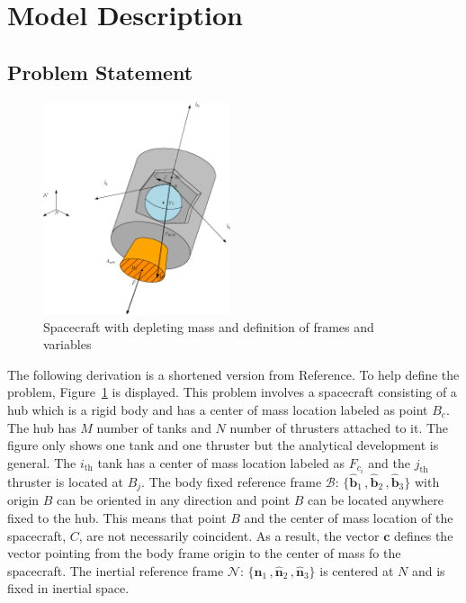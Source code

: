 
\section{Model Description}

\subsection{Problem Statement}

\begin{figure}[!htb]
	\centering
	\includegraphics[width=0.49\textwidth]{./Figures/Disegno1.eps}
	\caption{Spacecraft with depleting mass and definition of frames and variables}
	\label{fig:Spacecraft}
\end{figure}

The following derivation is a shortened version from Reference\cite{Panicucci:2017fu}. To help define the problem, Figure~\ref{fig:Spacecraft} is displayed. This problem involves a spacecraft consisting of a hub which is a rigid body and has a center of mass location labeled as point $B_c$. The hub has $M$ number of tanks and $N$ number of thrusters attached to it. The figure only shows one tank and one thruster but the analytical development is general. The $i_{\text{th}}$ tank has a center of mass location labeled as $F_{c_i}$ and the $j_{\text{th}}$ thruster is located at $B_j$. The body fixed reference frame $\mathcal{B}$: $\{\bm{\hat{b}}_1\,, \bm{\hat{b}}_2\,,\bm{\hat{b}}_3 \}$ with origin $B$ can be oriented in any direction and point $B$ can be located anywhere fixed to the hub. This means that point $B$ and the center of mass location of the spacecraft, $C$, are not necessarily coincident. As a result, the vector $\bm c$ defines the vector pointing from the body frame origin to the center of mass fo the spacecraft. The inertial reference frame $\mathcal{N}$: $\{\bm{\hat{n}}_1\,, \bm{\hat{n}}_2\,,\bm{\hat{n}}_3 \}$ is centered at $N$ and is fixed in inertial space.
	
